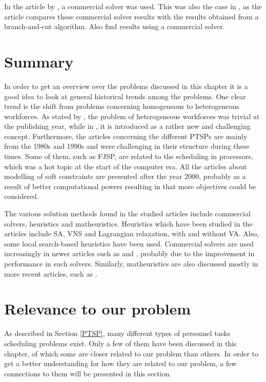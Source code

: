 In the article by \citet{eiselt_2008}, a commercial solver was used. This was also the case in \citet{mohan_2008}, as the article compares these commercial solver results with the results obtained from a branch-and-cut algorithm. Also \cite{shahnazari_2013} find results using a commercial solver.

\section{Summary}

In order to get an overview over the problems discussed in this chapter it is a good idea to look at general historical trends among the problems. One clear trend is the shift from problems concerning homogeneous to heterogeneous workforces. As stated by \citet{krishnamoorthy_2012}, the problem of heterogeneous workforces was trivial at the publishing year, while in \citet{loucks_1991}, it is introduced as a rather new and challenging concept. Furthermore, the articles concerning the different PTSPs are mainly from the 1980s and 1990s and were challenging in their structure during these times. Some of them, such as FJSP, are related to the scheduling in processors, which was a hot topic at the start of the computer era. All the articles about modelling of soft constraints are presented after the year 2000, probably as a result of better computational powers resulting in that more objectives could be considered.

The various solution methods found in the studied articles include commercial solvers, heuristics and matheuristics. Heuristics which have been studied in the articles include SA, VNS and Lagrangian relaxation, with and without VA. Also, some local search-based heuristics have been used. Commercial solvers are used increasingly in newer articles such as \citet{mohan_2008} and \citet{hojati_2011}, probably due to the improvement in performance in such solvers. Similarly, matheuristics are also discussed mostly in more recent articles, such as \citet{akbari_2013}. 

\section{Relevance to our problem}

As described in Section \ref{PTSP}, many different types of personnel tasks scheduling problems exist. Only a few of them have been discussed in this chapter, of which some are closer related to our problem than others. In order to get a better understanding for how they are related to our problem, a few connections to them will be presented in this section.

